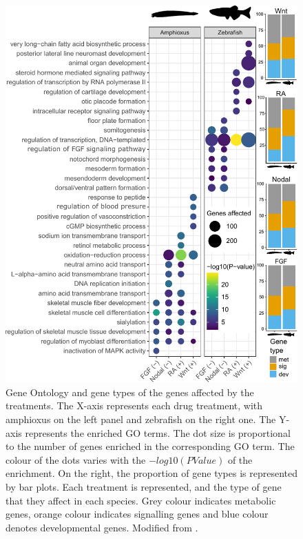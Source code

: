 \begin{figure}[hp]
\centering
\includegraphics[width=1\textwidth]{Figures/Effect_of_treatments_GOs_v2}
\caption[Transcriptomic effects of the treatments]{ Gene Ontology and gene types of the genes affected by the treatments. The X-axis represents each drug treatment, with amphioxus on the left panel and zebrafish on the right one. The Y-axis represents the enriched GO terms. The dot size is proportional to the number of genes enriched in the corresponding GO term. The colour of the dots varies with the $-log10(PValue)$ of the enrichment. On the right, the proportion of gene types is represented by bar plots. Each treatment is represented, and the type of gene that they affect in each species. Grey colour indicates metabolic genes, orange colour indicates signalling genes and blue colour denotes developmental genes. Modified from \parencite{gil-galvez_gain_2022}.
}
\label{fig:effect_of_treatments}
\end{figure} 



